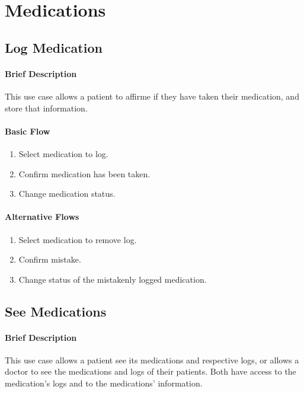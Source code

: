 \documentclass{report}
\begin{document}
\vspace{1em}
\section{Medications}
\subsection{Log Medication}
\paragraph{Brief Description}
This use case allows a patient to affirme if they have taken their medication, and store that information.

\begin{multicols}{2}
    \paragraph{Basic Flow}
    \begin{enumerate}
        \item Select medication to log.
        \item Confirm medication has been taken.
        \item Change medication status.
    \end{enumerate}
    \columnbreak

    \paragraph{Alternative Flows}
    \begin{enumerate}[label=A\arabic*.]
        \item Select medication to remove log.
        \item Confirm mistake.
        \item Change status of the mistakenly logged medication.
    \end{enumerate}
\end{multicols}

\vspace{1em}
\subsection{See Medications}
\paragraph{Brief Description}
This use case allows a patient see its medications and respective logs, or allows a doctor to see the medications and logs of their patients.
Both have access to the medication's logs and to the medications' information.
\end{document}
